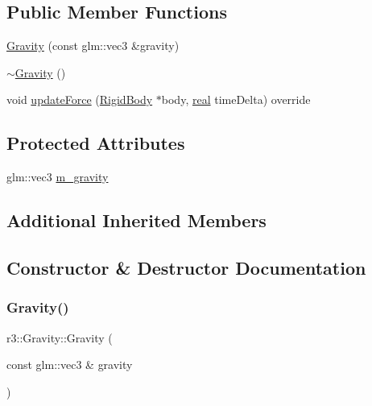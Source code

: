 \subsection*{Public Member Functions}
\begin{DoxyCompactItemize}
\item 
\mbox{\hyperlink{classr3_1_1_gravity_a1c5f6d085a7b1484c23f5a6df4b58b05}{Gravity}} (const glm\+::vec3 \&gravity)
\item 
\mbox{\hyperlink{classr3_1_1_gravity_abdf3edf32d08b6c5b9c2fc161635f993}{$\sim$\+Gravity}} ()
\item 
void \mbox{\hyperlink{classr3_1_1_gravity_ae3152c6a922ffa193aee362e161cd4a9}{update\+Force}} (\mbox{\hyperlink{classr3_1_1_rigid_body}{Rigid\+Body}} $\ast$body, \mbox{\hyperlink{namespacer3_ab2016b3e3f743fb735afce242f0dc1eb}{real}} time\+Delta) override
\end{DoxyCompactItemize}
\subsection*{Protected Attributes}
\begin{DoxyCompactItemize}
\item 
glm\+::vec3 \mbox{\hyperlink{classr3_1_1_gravity_a2feb1d84fc4118e6e30b707a7224f6ef}{m\+\_\+gravity}}
\end{DoxyCompactItemize}
\subsection*{Additional Inherited Members}


\subsection{Constructor \& Destructor Documentation}
\mbox{\label{classr3_1_1_gravity_a1c5f6d085a7b1484c23f5a6df4b58b05}} 
\subsubsection{\texorpdfstring{Gravity()}{Gravity()}}
{\footnotesize\ttfamily r3\+::\+Gravity\+::\+Gravity (\begin{DoxyParamCaption}\item[{const glm\+::vec3 \&}]{gravity }\end{DoxyParamCaption})\hspace{0.3cm}{\ttfamily [explicit]}}


